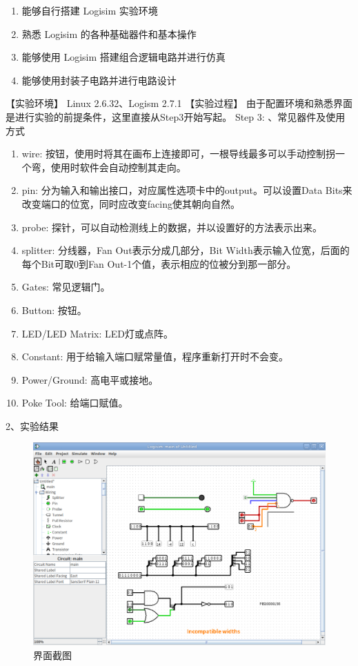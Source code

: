\documentclass[UTF8]{ctexart}
\begin{document}
\begin{enumerate}
    \item 能够自行搭建 Logisim 实验环境
    \item 熟悉 Logisim 的各种基础器件和基本操作
    \item 能够使用 Logisim 搭建组合逻辑电路并进行仿真
    \item 能够使用封装子电路并进行电路设计
\end{enumerate}
【实验环境】
\newline
Linux 2.6.32、Logism 2.7.1
\newline
【实验过程】
\newline
由于配置环境和熟悉界面是进行实验的前提条件，这里直接从Step3开始写起。
\newline
Step 3:
、常见器件及使用方式
\newline
\begin{enumerate}
    \item wire: 按钮，使用时将其在画布上连接即可，一根导线最多可以手动控制拐一个弯，使用时软件会自动控制其走向。
    \item pin: 分为输入和输出接口，对应属性选项卡中的output。可以设置Data Bits来改变端口的位宽，同时应改变facing使其朝向自然。
    \item probe: 探针，可以自动检测线上的数据，并以设置好的方法表示出来。
    \item splitter: 分线器，Fan Out表示分成几部分，Bit Width表示输入位宽，后面的每个Bit可取0到Fan Out-1个值，表示相应的位被分到那一部分。
    \item Gates: 常见逻辑门。
    \item Button: 按钮。
    \item LED/LED Matrix: LED灯或点阵。
    \item Constant: 用于给输入端口赋常量值，程序重新打开时不会变。
    \item Power/Ground: 高电平或接地。
    \item Poke Tool: 给端口赋值。
\end{enumerate}
2、实验结果
\begin{figure}[h!]
    \centering
    \includegraphics[scale=0.6]{step3.PNG}
    \caption{界面截图}
\end{figure}
\end{document}
